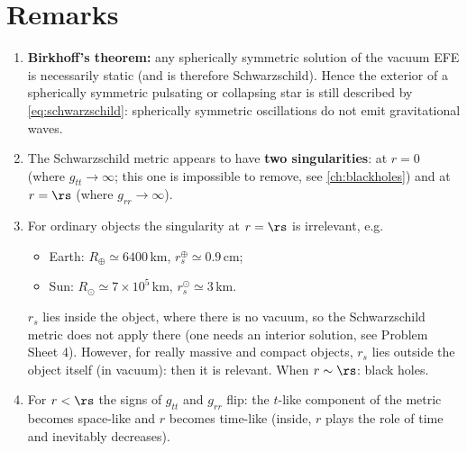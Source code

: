 \section{Remarks}

\begin{enumerate}
\item \textbf{Birkhoff's theorem:} any spherically symmetric solution of the vacuum EFE is necessarily static (and is therefore Schwarzschild). Hence the exterior of a spherically symmetric pulsating or collapsing star is still described by \eqref{eq:schwarzschild}: spherically symmetric oscillations do not emit gravitational waves.
\item The Schwarzschild metric appears to have \textbf{two singularities}: at $r=0$ (where $g_{tt}\to\infty$; this one is impossible to remove, see \cref{ch:blackholes}) and at $r=\rs$ (where $g_{rr}\to\infty$).
\item For ordinary objects the singularity at $r=\rs$ is irrelevant, e.g.
\begin{itemize}[nosep]
\item Earth: $R_\oplus\simeq6400$\,km, $r_s^\oplus\simeq0.9$\,cm;
\item Sun: $R_\odot\simeq7\times10^5$\,km, $r_s^\odot\simeq3$\,km.
\end{itemize}
$r_s$ lies inside the object, where there is no vacuum, so the Schwarzschild metric does not apply there (one needs an interior solution, see Problem Sheet 4). However, for really massive and compact objects, $r_s$ lies outside the object itself (in vacuum): then it is relevant. When $r\sim\rs$: black holes.
\item For $r<\rs$ the signs of $g_{tt}$ and $g_{rr}$ flip: the $t$-like component of the metric becomes space-like and $r$ becomes time-like (inside, $r$ plays the role of time and inevitably decreases).
\end{enumerate}

